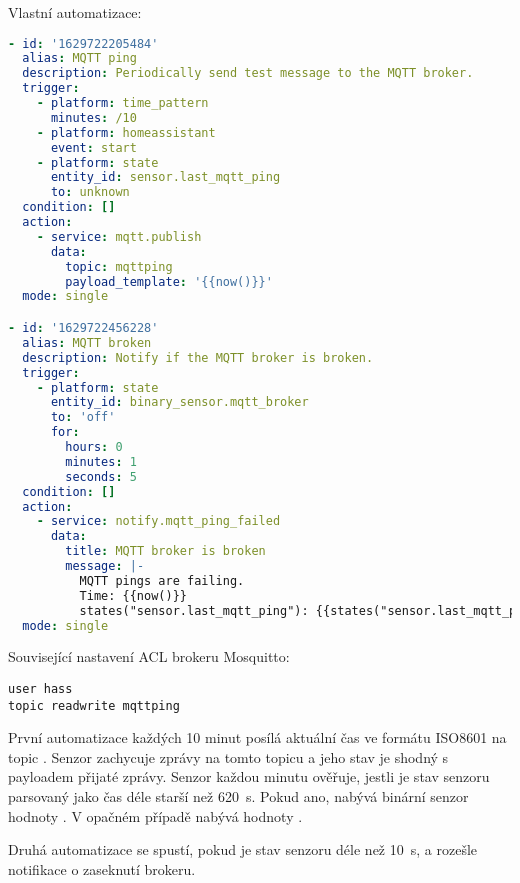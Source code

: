 Vlastní automatizace:
\begin{lstlisting}[language=yaml, style=numbers]
- id: '1629722205484'
  alias: MQTT ping
  description: Periodically send test message to the MQTT broker.
  trigger:
    - platform: time_pattern
      minutes: /10
    - platform: homeassistant
      event: start
    - platform: state
      entity_id: sensor.last_mqtt_ping
      to: unknown
  condition: []
  action:
    - service: mqtt.publish
      data:
        topic: mqttping
        payload_template: '{{now()}}'
  mode: single

- id: '1629722456228'
  alias: MQTT broken
  description: Notify if the MQTT broker is broken.
  trigger:
    - platform: state
      entity_id: binary_sensor.mqtt_broker
      to: 'off'
      for:
        hours: 0
        minutes: 1
        seconds: 5
  condition: []
  action:
    - service: notify.mqtt_ping_failed
      data:
        title: MQTT broker is broken
        message: |-
          MQTT pings are failing.
          Time: {{now()}}
          states("sensor.last_mqtt_ping"): {{states("sensor.last_mqtt_ping")}}
  mode: single
\end{lstlisting}


Související nastavení ACL brokeru Mosquitto:
\begin{lstlisting}
user hass
topic readwrite mqttping
\end{lstlisting}


První automatizace každých 10 minut posílá aktuální čas ve formátu ISO8601 na
topic . Senzor  zachycuje
zprávy na tomto topicu a jeho stav je shodný s payloadem přijaté zprávy.
Senzor  každou minutu ověřuje, jestli je
stav senzoru  parsovaný jako čas déle starší
než \SI{620}{\second}. Pokud ano, nabývá binární senzor hodnoty .
V opačném případě nabývá hodnoty .

Druhá automatizace se spustí, pokud je stav senzoru
  déle než \SI{10}{\second},
a rozešle notifikace o zaseknutí brokeru.
